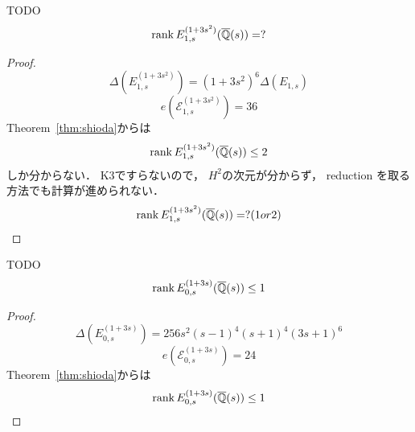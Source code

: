 \documentclass[main]{subfiles}
\begin{document}
\begin{thm}
    TODO
    \begin{equation}
        \operatorname{rank} E_{1,s}^{(1 + 3s^{2})}(\overline{\mathbb{Q}}(s)) = ?
    \end{equation}
\end{thm}

\begin{proof}
    \begin{equation}
        \Delta(E_{1,s}^{(1 + 3s^{2})}) = (1 + 3s^{2})^{6} \Delta(E_{1,s})
    \end{equation}
    \begin{equation}
        e(\mathcal{E}_{1,s}^{(1 + 3s^{2})}) = 36
    \end{equation}
    Theorem~\ref{thm:shioda}からは
    \begin{equation}
        \operatorname{rank} E_{1,s}^{(1 + 3s^{2})}(\overline{\mathbb{Q}}(s)) \leq 2
    \end{equation}
    しか分からない．
    K3ですらないので， $H^2$の次元が分からず， reduction を取る方法でも計算が進められない．
    \begin{equation}
        \operatorname{rank} E_{1,s}^{(1 + 3s^{2})}(\overline{\mathbb{Q}}(s)) = ? (1 or 2)
    \end{equation}
\end{proof}


\begin{thm}
    TODO
    \begin{equation}
        \operatorname{rank} E_{0,s}^{(1 + 3s)}(\overline{\mathbb{Q}}(s)) \leq 1
    \end{equation}
\end{thm}
\begin{proof}
    \begin{equation}
        \Delta(E_{0,s}^{(1 + 3s)}) = 256s^{2}(s - 1)^{4}(s + 1)^{4}(3s + 1)^{6}
    \end{equation}
    \begin{equation}
        e(\mathcal{E}_{0,s}^{(1 + 3s)}) = 24
    \end{equation}
    Theorem~\ref{thm:shioda}からは
    \begin{equation}
        \operatorname{rank} E_{0,s}^{(1 + 3s)}(\overline{\mathbb{Q}}(s)) \leq 1
    \end{equation}
\end{proof}
\end{document}
